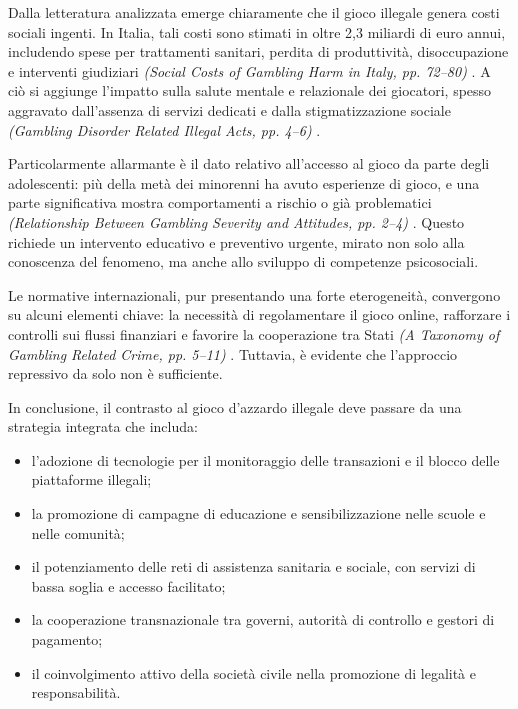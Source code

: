 \documentclass[a4paper,12pt]{article}
\begin{document}
Dalla letteratura analizzata emerge chiaramente che il gioco illegale genera costi sociali ingenti. In Italia, tali costi sono stimati in oltre 2,3 miliardi di euro annui, includendo spese per trattamenti sanitari, perdita di produttività, disoccupazione e interventi giudiziari \textit{(Social Costs of Gambling Harm in Italy, pp. 72--80)} \cite{lucchini2022socialcosts}. A ciò si aggiunge l’impatto sulla salute mentale e relazionale dei giocatori, spesso aggravato dall’assenza di servizi dedicati e dalla stigmatizzazione sociale \textit{(Gambling Disorder Related Illegal Acts, pp. 4--6)} \cite{gorsane2017illegalacts}.

Particolarmente allarmante è il dato relativo all’accesso al gioco da parte degli adolescenti: più della metà dei minorenni ha avuto esperienze di gioco, e una parte significativa mostra comportamenti a rischio o già problematici \textit{(Relationship Between Gambling Severity and Attitudes, pp. 2--4)} \cite{gori2014adolescentgambling}. Questo richiede un intervento educativo e preventivo urgente, mirato non solo alla conoscenza del fenomeno, ma anche allo sviluppo di competenze psicosociali.

Le normative internazionali, pur presentando una forte eterogeneità, convergono su alcuni elementi chiave: la necessità di regolamentare il gioco online, rafforzare i controlli sui flussi finanziari e favorire la cooperazione tra Stati \textit{(A Taxonomy of Gambling Related Crime, pp. 5--11)} \cite{banks2018taxonomy}. Tuttavia, è evidente che l’approccio repressivo da solo non è sufficiente.

In conclusione, il contrasto al gioco d’azzardo illegale deve passare da una strategia integrata che includa:

\begin{itemize}
    \item l’adozione di tecnologie per il monitoraggio delle transazioni e il blocco delle piattaforme illegali;
    \item la promozione di campagne di educazione e sensibilizzazione nelle scuole e nelle comunità;
    \item il potenziamento delle reti di assistenza sanitaria e sociale, con servizi di bassa soglia e accesso facilitato;
    \item la cooperazione transnazionale tra governi, autorità di controllo e gestori di pagamento;
    \item il coinvolgimento attivo della società civile nella promozione di legalità e responsabilità.
\end{itemize}
\end{document}
